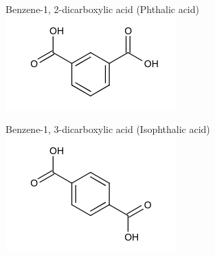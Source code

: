 \documentclass[10pt]{article}
\begin{document}
Benzene-1, 2-dicarboxylic acid (Phthalic acid)\\
\includegraphics{smile-aeb8caf518d2156f7fd75222b4d1e6ffa600f700}

Benzene-1, 3-dicarboxylic acid (Isophthalic acid)\\
\includegraphics{smile-c077dab14a4b2c45a02bbd424c95d5892f5c5305}
\end{document}
